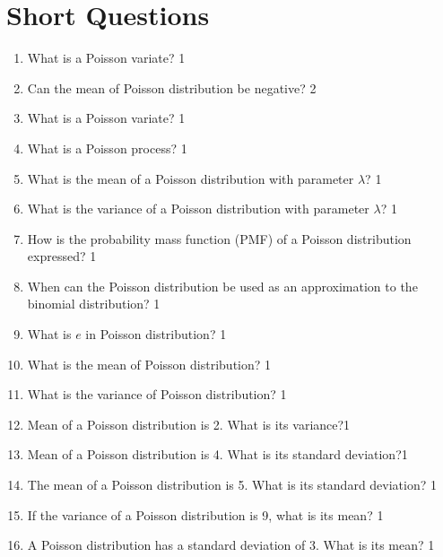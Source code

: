\documentclass[a4paper,oneside]{book}
\begin{document}
\section{Short Questions}

\begin{enumerate}

    \item
	What is a Poisson variate? \hfill 1
    \item
	Can the mean of Poisson distribution be negative? \hfill 2

  \item What is a Poisson variate? \hfill 1
  
  \item What is a Poisson process?  \hfill 1
  
  \item What is the mean of a Poisson distribution with parameter \( \lambda \)? \hfill 1

\item What is the variance of a Poisson distribution with parameter \( \lambda \)? \hfill 1

\item How is the probability mass function (PMF) of a Poisson distribution expressed? \hfill 1

\item When can the Poisson distribution be used as an approximation to the binomial distribution? \hfill 1

\item What is $e$ in Poisson distribution? \hfill 1

\item What is the mean of Poisson distribution? \hfill 1

\item What is the variance of Poisson distribution? \hfill 1

\item Mean of a Poisson distribution is 2. What is its variance?\hfill 1

\item Mean of a Poisson distribution is 4. What is its standard deviation?\hfill 1

\item The mean of a Poisson distribution is 5. What is its standard deviation? \hfill 1

\item If the variance of a Poisson distribution is 9, what is its mean? \hfill 1

\item A Poisson distribution has a standard deviation of 3. What is its mean? \hfill 1


\end{enumerate}
\end{document}
